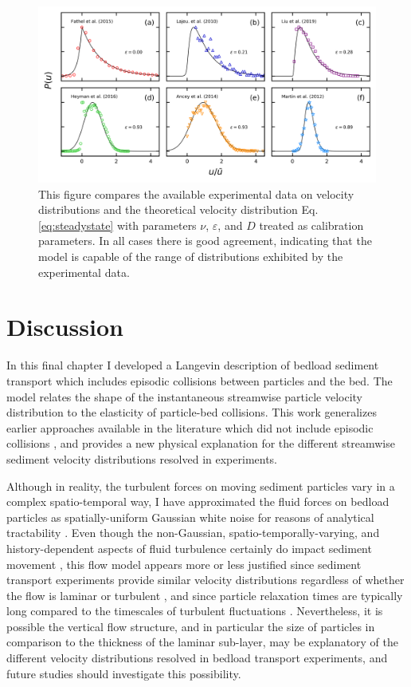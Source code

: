 \begin{figure}
	\centerline{\includegraphics{./figures/ch5/Fig4expComparison.png}}
	\caption{This figure compares the available experimental data on velocity distributions and the theoretical velocity distribution Eq. \ref{eq:steadystate} with parameters $\nu$, $\varepsilon$, and $D$ treated as calibration parameters. In all cases there is good agreement, indicating that the model is capable of the range of distributions exhibited by the experimental data.} \label{fig:fig4ch5}
\end{figure}


\section{Discussion}
\label{sec:langdiscussion}

In this final chapter I developed a Langevin description of bedload sediment transport which includes episodic collisions between particles and the bed.
The model relates the shape of the instantaneous streamwise particle velocity distribution to the elasticity of particle-bed collisions.
This work generalizes earlier approaches available in the literature which did not include episodic collisions \citep{Ancey2014,Fan2014}, and provides a new physical explanation for the different streamwise sediment velocity distributions resolved in experiments.

Although in reality, the turbulent forces on moving sediment particles vary in a complex spatio-temporal way, I have approximated the fluid forces on bedload particles as spatially-uniform Gaussian white noise for reasons of analytical tractability \cite[e.g.][]{Michaelides1997}. Even though the non-Gaussian, spatio-temporally-varying, and history-dependent aspects of fluid turbulence certainly do impact sediment movement \citep{Cameron2020,Celik2014}, this flow model appears more or less justified since sediment transport experiments provide similar velocity distributions regardless of whether the flow is laminar or turbulent \citep{Lajeunesse2010, Charru2004}, and since particle relaxation times are typically long compared to the timescales of turbulent fluctuations \citep{Hofland2006,Schmeeckle2007,Nakagawa1981}.
Nevertheless, it is possible the vertical flow structure, and in particular the size of particles in comparison to the thickness of the laminar sub-layer, may be explanatory of the different velocity distributions resolved in bedload transport experiments, and future studies should investigate this possibility.

